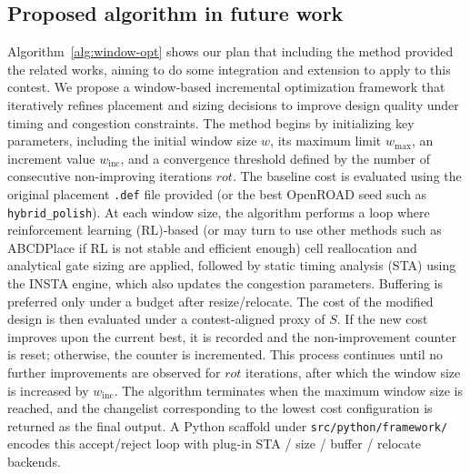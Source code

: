 \documentclass[conference]{IEEEtran}
\begin{document}
\subsection{Proposed algorithm in future work}
Algorithm~\ref{alg:window-opt} shows our plan that including the method provided the related works, aiming to do some integration and extension to apply to this contest. We propose a window-based incremental optimization framework that iteratively refines placement and sizing decisions to improve design quality under timing and congestion constraints. The method begins by initializing key parameters, including the initial window size \( w \), its maximum limit \( w_{\text{max}} \), an increment value \( w_{\text{inc}} \), and a convergence threshold defined by the number of consecutive non-improving iterations \( rot \). The baseline cost is evaluated using the original placement \texttt{.def} file provided (or the best OpenROAD seed such as \texttt{hybrid\_polish}). At each window size, the algorithm performs a loop where reinforcement learning (RL)-based (or may turn to use other methods such as ABCDPlace if RL is not stable and efficient enough) cell reallocation and analytical gate sizing are applied, followed by static timing analysis (STA) using the INSTA engine, which also updates the congestion parameters. Buffering is preferred only under a budget after resize/relocate. The cost of the modified design is then evaluated under a contest-aligned proxy of $S$. If the new cost improves upon the current best, it is recorded and the non-improvement counter is reset; otherwise, the counter is incremented. This process continues until no further improvements are observed for \( rot \) iterations, after which the window size is increased by \( w_{\text{inc}} \). The algorithm terminates when the maximum window size is reached, and the changelist corresponding to the lowest cost configuration is returned as the final output. A Python scaffold under \texttt{src/python/framework/} encodes this accept/reject loop with plug-in STA / size / buffer / relocate backends.
\end{document}
